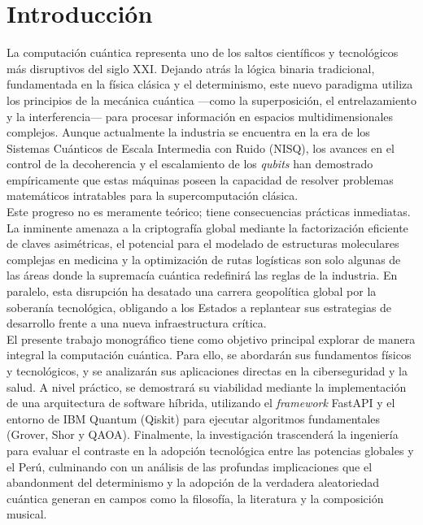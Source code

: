 \documentclass[12pt,a4paper]{article}
\begin{document}
\section{Introducción}
La computación cuántica representa uno de los saltos científicos y tecnológicos más disruptivos del siglo XXI. Dejando atrás la lógica binaria tradicional, fundamentada en la física clásica y el determinismo, este nuevo paradigma utiliza los principios de la mecánica cuántica —como la superposición, el entrelazamiento y la interferencia— para procesar información en espacios multidimensionales complejos. Aunque actualmente la industria se encuentra en la era de los Sistemas Cuánticos de Escala Intermedia con Ruido (NISQ), los avances en el control de la decoherencia y el escalamiento de los \textit{qubits} han demostrado empíricamente que estas máquinas poseen la capacidad de resolver problemas matemáticos intratables para la supercomputación clásica.\\

Este progreso no es meramente teórico; tiene consecuencias prácticas inmediatas. La inminente amenaza a la criptografía global mediante la factorización eficiente de claves asimétricas, el potencial para el modelado de estructuras moleculares complejas en medicina y la optimización de rutas logísticas son solo algunas de las áreas donde la supremacía cuántica redefinirá las reglas de la industria. En paralelo, esta disrupción ha desatado una carrera geopolítica global por la soberanía tecnológica, obligando a los Estados a replantear sus estrategias de desarrollo frente a una nueva infraestructura crítica.\\

El presente trabajo monográfico tiene como objetivo principal explorar de manera integral la computación cuántica. Para ello, se abordarán sus fundamentos físicos y tecnológicos, y se analizarán sus aplicaciones directas en la ciberseguridad y la salud. A nivel práctico, se demostrará su viabilidad mediante la implementación de una arquitectura de software híbrida, utilizando el \textit{framework} FastAPI y el entorno de IBM Quantum (Qiskit) para ejecutar algoritmos fundamentales (Grover, Shor y QAOA). Finalmente, la investigación trascenderá la ingeniería para evaluar el contraste en la adopción tecnológica entre las potencias globales y el Perú, culminando con un análisis de las profundas implicaciones que el abandonment del determinismo y la adopción de la verdadera aleatoriedad cuántica generan en campos como la filosofía, la literatura y la composición musical.
\end{document}

